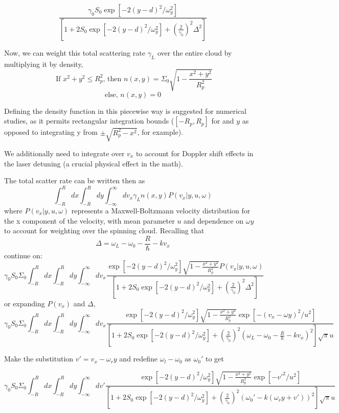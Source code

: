 \documentclass[11pt, oneside,reqno]{amsart}   	%
\newcommand{\eqn}[1]{\begin{equation}#1 \end{equation}}
\begin{document}
\eqn{ \frac{\gamma_0 S_0 \exp [ -2 (y-d)^2/\omega_y^2] }{\left[ 1+2S_0 \exp [ -2 (y-d)^2/\omega_y^2] +\left( \frac{2}{\gamma_0} \right)^2 \Delta^2 \right]}}

Now, we can weight this total scattering rate $\gamma_L$ over the entire cloud by multiplying it by density,
 \eqn{ \text{ If $x^2+y^2 \leq R_p^2$, then } n(x,y) = \Sigma_0 \sqrt{1-\frac{x^2+y^2}{R_p^2}} }
\eqn{ \text{else, } n(x,y)= 0}

Defining the density function in this piecewise way is suggested for numerical studies, as it permits rectangular integration bounds ($[-R_p,R_p]$ for and $y$ as opposed to integrating y from $\pm \sqrt{R_p^2-x^2}$, for example).

We additionally need to integrate over $v_x$ to account for Doppler shift effects in the laser detuning (a crucial physical effect in the math).

The total scatter rate can be written then as
\eqn{ \int_{-R}^{R} dx \int_{-R}^R  dy \int_{-\infty}^{\infty} dv_x \gamma_L n(x,y) P(v_x| y, u,\omega)}
where $P(v_x| y, u,\omega)$ represents a Maxwell-Boltzmann velocity distribution for the x component of the velocity, with mean parameter $u$ and dependence on $\omega y$ to account for weighting over the spinning cloud.  Recalling that  \eqn{\Delta= \omega_L - \omega_0 - \frac{R}{\hbar} - kv_x}
continue on:
\eqn{ \gamma_0 S_0 \Sigma_0
 \int_{-R}^{R} dx \int_{-R}^R  dy \int_{-\infty}^{\infty} dv_x 
 \frac{
 \exp [ -2 (y-d)^2/\omega_y^2] \sqrt{1-\frac{x^2+y^2}{R_p^2}} P(v_x| y, u,\omega)}
 { \left[ 1+2S_0 \exp [ -2 (y-d)^2/\omega_y^2] +\left( \frac{2}{\gamma_0} \right)^2 \Delta^2 \right]}
 }
or expanding $P(v_x)$ and $\Delta$,
\eqn{ \gamma_0 S_0 \Sigma_0
 \int_{-R}^{R} dx \int_{-R}^R  dy \int_{-\infty}^{\infty} dv_x 
 \frac{
 \exp [ -2 (y-d)^2/\omega_y^2] \sqrt{1-\frac{x^2+y^2}{R_p^2}} \exp [- (v_x-\omega y)^2 /u^2]
 }
 { \left[ 1+2S_0 \exp [ -2 (y-d)^2/\omega_y^2] +\left( \frac{2}{\gamma_0} \right)^2  (\omega_L - \omega_0 - \frac{R}{\hbar} - kv_x)^2 \right]\sqrt{\pi} u}
 }
 
 Make the substitution $v'= v_x-\omega_r y$ and redefine $\omega_l-\omega_0$ as $\omega_0'$ to get

 \eqn{ \gamma_0 S_0 \Sigma_0
 \int_{-R}^{R} dx \int_{-R}^R  dy \int_{-\infty}^{\infty} dv' 
 \frac{
 \exp [ -2 (y-d)^2/\omega_y^2] \sqrt{1-\frac{x^2+y^2}{R_p^2}} \exp [-v'^2 /u^2]
 }
 { \left[ 1+2S_0 \exp [ -2 (y-d)^2/\omega_y^2] +\left( \frac{2}{\gamma_0} \right)^2  (\omega_0' - k(\omega_r y +v'))^2 \right]\sqrt{\pi} u}
 } 
\end{document}
